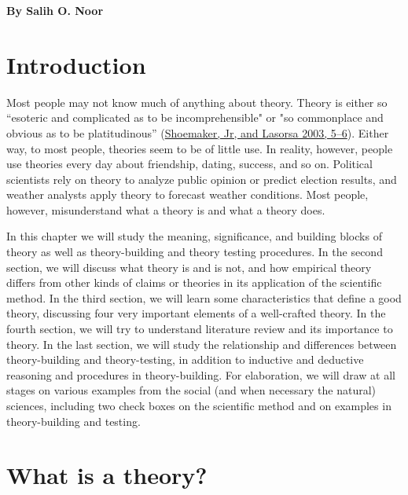 \documentclass{book}
\begin{document}
\textbf{By Salih O. Noor}

\hypertarget{introduction-2}{%
\section{Introduction}\label{introduction-2}}

Most people may not know much of anything about theory. Theory is either so
``esoteric and complicated as to be incomprehensible" or "so commonplace and
obvious as to be platitudinous''
(\protect\hyperlink{ref-shoemakerHowBuildSocial2003}{Shoemaker, Jr, and
Lasorsa 2003, 5--6}). Either way, to most people, theories seem to be of
little use. In reality, however, people use theories every day about
friendship, dating, success, and so on. Political scientists rely on theory to
analyze public opinion or predict election results, and weather analysts apply
theory to forecast weather conditions. Most people, however, misunderstand
what a theory is and what a theory does.

In this chapter we will study the meaning, significance, and building blocks
of theory as well as theory-building and theory testing procedures. In the
second section, we will discuss what theory is and is not, and how empirical
theory differs from other kinds of claims or theories in its application of
the scientific method. In the third section, we will learn some
characteristics that define a good theory, discussing four very important
elements of a well-crafted theory. In the fourth section, we will try to
understand literature review and its importance to theory. In the last
section, we will study the relationship and differences between
theory-building and theory-testing, in addition to inductive and deductive
reasoning and procedures in theory-building. For elaboration, we will draw at
all stages on various examples from the social (and when necessary the
natural) sciences, including two check boxes on the scientific method and on
examples in theory-building and testing.

\hypertarget{what-is-a-theory}{%
\section{What is a theory?}\label{what-is-a-theory}}
\end{document}
